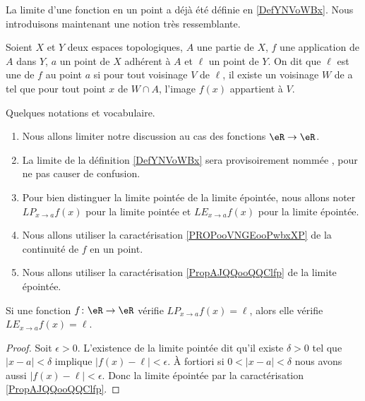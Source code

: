La limite d'une fonction en un point a déjà été définie en \ref{DefYNVoWBx}. Nous introduisons maintenant une notion très ressemblante.

\begin{definition}     \label{DEFooBAPHooUtIaRS}
    Soient $X$ et $Y$ deux espaces topologiques, $A$ une partie de $X$, $f$ une application de $A$ dans $Y$, $a$ un point de $X$ adhérent à $A$ et \(\ell \) un point de $Y$. On dit que \( \ell\) est une  de $f$ au point $a$ si pour tout voisinage $V$ de \( \ell\), il existe un voisinage $W$ de a tel que pour tout point $x$ de $W\cap A$, l'image $f(x)$ appartient à $V$.
\end{definition}

Quelques notations et vocabulaire.
\begin{enumerate}
    \item
Nous allons limiter notre discussion au cas des fonctions \( \eR\to \eR\). 
    \item 
        La limite de la définition \ref{DefYNVoWBx} sera provisoirement nommée , pour ne pas causer de confusion.
    \item
        Pour bien distinguer la limite pointée de la limite épointée, nous allons noter \( {LP}_{x\to a}f(x)\) pour la limite pointée et \( {LE}_{x\to a}f(x)\) pour la limite épointée.
\item
Nous allons utiliser la caractérisation \ref{PROPooVNGEooPwbxXP} de la continuité de \( f\) en un point.
\item
    Nous allons utiliser la caractérisation \ref{PropAJQQooQQClfp} de la limite épointée.
\end{enumerate}

\begin{lemma}       \label{LEMooWAZLooDPvemu}
    Si une fonction \( f\colon \eR\to \eR\) vérifie \( {LP}_{x\to a} f(x)=\ell\), alors elle vérifie \( {LE}_{x\to a}f(x)=\ell\).
\end{lemma}

\begin{proof}
    Soit \( \epsilon>0\). L'existence de la limite pointée dit qu'il existe \( \delta>0\) tel que \( | x-a |<\delta\) implique \( | f(x)-\ell |<\epsilon\). À fortiori si \( 0<| x-a |<\delta\) nous avons aussi \( | f(x)-\ell |<\epsilon\). Donc la limite épointée par la caractérisation \ref{PropAJQQooQQClfp}.
\end{proof}

